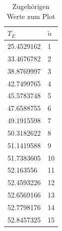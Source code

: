 \documentclass[12pt,a4paper,titlepage]{scrreprt}
\begin{document}
	\begin{table}[H]
		\centering
		\begin{tabular}{l|l}
			\textbf{$T_E$}&\textbf{$\tilde{n}$}\\\hline
				25.4529162&1\\
				33.4676782&2\\
				38.8769997&3\\
				42.7499765&4\\
				45.5783748&5\\
				47.6588755&6\\
				49.1915598&7\\
				50.3182622&8\\
				51.1419588&9\\
				51.7383605&10\\
				52.163556&11\\
				52.4593226&12\\
				52.6569166&13\\
				52.7798176&14\\
				52.8457325&15 
		\end{tabular}
	\caption{Zugehörigen Werte zum Plot}
	\label{T1}
	\end{table}
	
\end{document}
